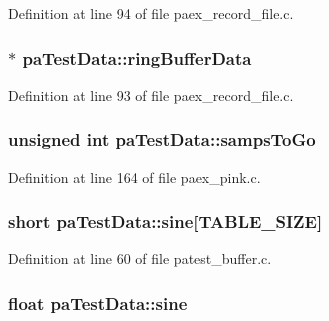 Definition at line 94 of file paex\+\_\+record\+\_\+file.\+c.

\subsubsection[{\texorpdfstring{ring\+Buffer\+Data}{ringBufferData}}]{$\ast$ pa\+Test\+Data\+::ring\+Buffer\+Data}\hypertarget{structpa_test_data_a76e2746fceebfb98734da5823838ae19}{}\label{structpa_test_data_a76e2746fceebfb98734da5823838ae19}


Definition at line 93 of file paex\+\_\+record\+\_\+file.\+c.

\subsubsection[{\texorpdfstring{samps\+To\+Go}{sampsToGo}}]{\setlength{\rightskip}{0pt plus 5cm}unsigned {\bf int} pa\+Test\+Data\+::samps\+To\+Go}\hypertarget{structpa_test_data_a6327d3b5f0e9dabfdf4716b241b456ef}{}\label{structpa_test_data_a6327d3b5f0e9dabfdf4716b241b456ef}


Definition at line 164 of file paex\+\_\+pink.\+c.

\subsubsection[{\texorpdfstring{sine}{sine}}]{\setlength{\rightskip}{0pt plus 5cm}short pa\+Test\+Data\+::sine\mbox{[}{\bf T\+A\+B\+L\+E\+\_\+\+S\+I\+ZE}\mbox{]}}\hypertarget{structpa_test_data_acb011e779e4d245f4643fd3c3143e5b3}{}\label{structpa_test_data_acb011e779e4d245f4643fd3c3143e5b3}


Definition at line 60 of file patest\+\_\+buffer.\+c.

\subsubsection[{\texorpdfstring{sine}{sine}}]{\setlength{\rightskip}{0pt plus 5cm}float pa\+Test\+Data\+::sine}\hypertarget{structpa_test_data_ae193ea73c8894d186396d0730cf260e5}{}\label{structpa_test_data_ae193ea73c8894d186396d0730cf260e5}


